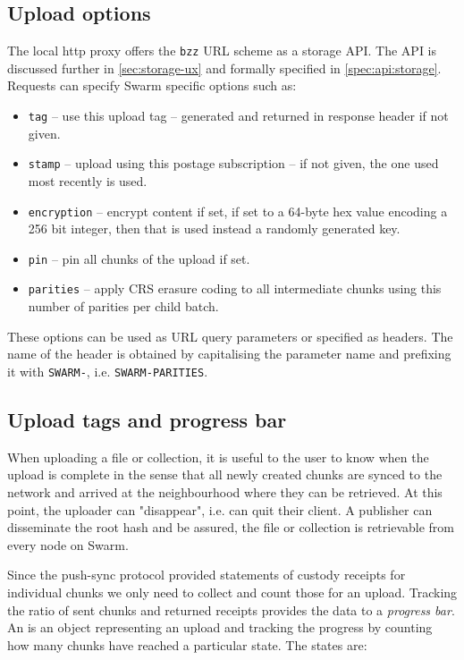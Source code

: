 \subsection{Upload options \statusgreen}\label{sec:headers}

The local http proxy offers the \lstinline{bzz} URL scheme as a storage API. The API is discussed further in \ref{sec:storage-ux} and formally specified in \ref{spec:api:storage}. Requests can specify Swarm specific options such as:

\begin{itemize}
\item \lstinline{tag} -- use this upload tag -- generated and returned in response header if not given. 
\item \lstinline{stamp} -- upload using this postage subscription -- if not given, the one used most recently is used. 
\item \lstinline{encryption} -- encrypt content if set, if set to a 64-byte hex value encoding a 256 bit integer, then that is used instead a randomly generated key. 
\item \lstinline{pin} -- pin all chunks of the upload if set. 
\item \lstinline{parities} -- apply CRS erasure coding to all intermediate chunks using this number of parities per child batch.
\end{itemize}

These options can be used as URL query parameters or specified as  headers. The name of the header is obtained by capitalising the parameter name and prefixing it with \lstinline{SWARM-},  i.e. \lstinline{SWARM-PARITIES}.  


\subsection{Upload tags and progress bar \statusgreen}\label{sec:tags}                                                                                        
When uploading a file or collection, it is useful to the user to know when the upload is complete in the sense that all newly created chunks are synced to the network and arrived at the neighbourhood where they can be retrieved. At this point, the uploader can "disappear", i.e. can quit their client. A publisher can disseminate the root hash and be assured, the file or collection is retrievable from every node on Swarm. 

Since the push-sync protocol provided statements of custody receipts for individual chunks we only need to collect and count those for an upload. Tracking the ratio of sent chunks and returned receipts provides the data to a \emph{progress bar}. An  is an object representing an upload and tracking the progress by counting how many chunks have reached a particular state. The states are: 

